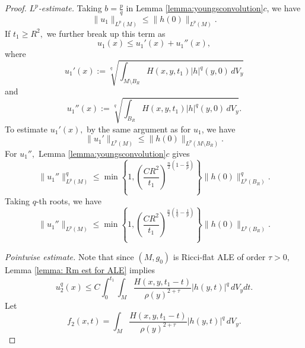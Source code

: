 \documentclass[12pt]{amsart}
\renewcommand{\1}{{\mathbf 1}}
\theoremstyle{others}
\numberwithin{equation}{section}
\begin{document}
\begin{proof}
\noindent \emph{$L^p$-estimate.} Taking $b = \frac{p}{q}$ in Lemma \ref{lemma:youngsconvolution}$c$, we have
     \begin{equation}\label{u1Lpest}
        \| u_1 \|_{L^p{(M)}} \leq \|h(0)\|_{L^{p}{(M)}}.
          \end{equation}
If $t_1 \geq R^2,$ we further break up this term as
$$u_1(x) \leq u_1'(x) + u_1''(x),$$
where
$$u_1'(x) := \sqrt[q]{\int_{M \setminus B_R} H(x,y,t_1) |h|^q(y,0) \, dV_y}$$
and
$$u_1''(x) := \sqrt[q]{\int_{B_R} H(x,y,t_1) |h|^q(y,0) \, dV_y}.$$
To estimate $u_1'(x),$ by the same argument as for $u_1$, we have
    $$\| u_1' \|_{L^p(M)} \leq \|h(0)\|_{L^{p}(M \setminus B_R)}.$$
For $u_1'',$ Lemma \ref{lemma:youngsconvolution}$c$ gives
$$ \|u_1''\|_{L^p(M)}^q \leq \min \left\{ 1, \left( \frac{C R^2}{t_1 } \right)^{\frac{n}{2}\left( 1- \frac{q}{p} \right)} \right\} \|h(0) \|_{L^p{(B_R)}}^q.$$
Taking $q$-th roots, we have
\begin{equation}
\|u_1''\|_{L^p(M)} \leq \min \left\{ 1, \left( \frac{C R^2}{t_1 } \right)^{\frac{n}{2}\left( \frac{1}{q} - \frac{1}{p} \right)} \right\} \|h(0) \|_{L^p{(B_R)}}.
\end{equation}

       \vspace{2mm}

        \emph{Pointwise estimate.}  Note that since $(M,g_0)$ is Ricci-flat ALE of order $\tau > 0,$ Lemma \ref{lemma: Rm est for ALE} implies
    \begin{equation*}
        u^q_2(x) \leq C \int_0^{t_1} \!\!\!\! \int_M \frac{H(x,y,t_1 - t)}{ \rho(y)^{2 + \tau} } |h(y,t)|^q \, dV_y dt.
    \end{equation*}
     Let
     $$f_2(x,t) = \int_M \frac{H(x,y,t_1 - t) }{ \rho(y)^{2 + \tau} } |h(y,t)|^q \, dV_y.$$


\end{proof}
\end{document}
